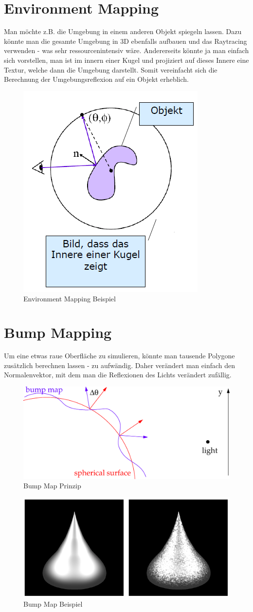 \section{Environment Mapping}
Man möchte z.B. die Umgebung in einem anderen Objekt spiegeln lassen. Dazu könnte man die gesamte Umgebung in 3D ebenfalls aufbauen und das Raytracing verwenden - was sehr ressourcenintensiv wäre. Andererseits könnte ja man einfach sich vorstellen, man ist im innern einer Kugel und projiziert auf dieses Innere eine Textur, welche dann die Umgebung darstellt. Somit vereinfacht sich die Berechnung der Umgebungsreflexion auf ein Objekt erheblich.
\begin{figure}[!ht]
	\centering
	\includegraphics[width=0.4\linewidth]{fig/environment_mapping}
	\caption{Environment Mapping Beispiel}
	\label{fig:environment_mapping}
\end{figure}
\section{Bump Mapping}
Um eine etwas raue Oberfläche zu simulieren, könnte man tausende Polygone zusätzlich berechnen lassen - zu aufwändig. Daher verändert man einfach den Normalenvektor, mit dem man die Reflexionen des Lichts verändert zufällig.
\begin{figure}[!ht]
	\centering
	\includegraphics[width=0.4\linewidth]{fig/bumpmap}
	\caption{Bump Map Prinzip}
	\label{fig:bumpmap}
\end{figure}
\begin{figure}[!ht]
	\centering
	\includegraphics[width=0.4\linewidth]{fig/bumpmap_bsp}
	\caption{Bump Map Beispiel}
	\label{fig:bumpmap_bsp}
\end{figure}